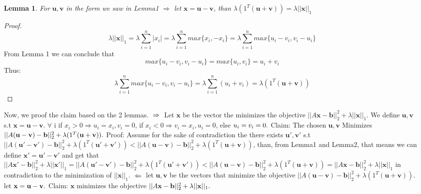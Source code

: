 \documentclass{article}
\newtheorem{lemma}{Lemma}
\begin{document}
\begin{enumerate}[(a)]
\begin{lemma} \label{b}
For $\mathbf{u}, \mathbf{v}$ in the form we saw in Lemma1 $\Rightarrow$ let $\mathbf{x} = \mathbf{u} - \mathbf{v}$, than $\lambda(1^T(\mathbf{u} + \mathbf{v})) = \lambda||\mathbf{x}||_1$
\end{lemma}
\begin{proof}
\[
\lambda||\mathbf{x}||_1 = \lambda\sum_{i=1}^{n}|x_i| = \lambda\sum_{i=1}^{n} max\{x_i, -x_i\} = \lambda\sum_{i=1}^{n}max\{u_i-v_i, v_i-u_i\}
\]
From Lemma 1 we can conclude that
\[
max\{u_i-v_i, v_i-u_i\} = max\{u_i, v_i\} = u_i + v_i
\]
Thus:
\[
\lambda\sum_{i=1}^{n} max\{u_i-v_i, v_i-u_i\} = \lambda\sum_{i=1}^{n} (u_i + v_i) = \lambda(1^T(\mathbf{u} + \mathbf{v}))
\]
\end{proof}
Now, we proof the claim based on the 2 lemmas.
$\\ \Rightarrow\\$
Let $\mathbf{x}$ be the vector the minimizes the objective $||A\mathbf{x} - \mathbf{b}||_2^2 + \lambda||\mathbf{x}||_1$. We define $\mathbf{u}, \mathbf{v}$ s.t $\mathbf{x} = \mathbf{u}-\mathbf{v}$. $\forall$ i if $x_i > 0 \Rightarrow u_i = x_i, v_i = 0$, if $x_i < 0 \Rightarrow v_i = x_i, u_i = 0$, else $u_i = v_i = 0.\\$
Claim: The chosen $\mathbf{u}, \mathbf{v}$ Minimizes $||A(\mathbf{u} - \mathbf{v}) - \mathbf{b}||_2^2 + \lambda(1^T(\mathbf{u} + \mathbf{v})).\\$ Proof: Assume for the sake of contradiction the there exists $\mathbf{u}', \mathbf{v}'$ s.t  $||A(\mathbf{u}' - \mathbf{v}') - \mathbf{b}||_2^2 + \lambda(1^T(\mathbf{u}' + \mathbf{v}')) < ||A(\mathbf{u} - \mathbf{v}) - \mathbf{b}||_2^2 + \lambda(1^T(\mathbf{u} + \mathbf{v}))$, than, from Lemma1 and Lemma2, that means we can define $\mathbf{x}'=\mathbf{u}'-\mathbf{v}'$ and get that $||A\mathbf{x}' - \mathbf{b}||_2^2 + \lambda||\mathbf{x}'||_1 = ||A(\mathbf{u}' - \mathbf{v}') - \mathbf{b}||_2^2 + \lambda(1^T(\mathbf{u}' + \mathbf{v}')) < ||A(\mathbf{u} - \mathbf{v}) - \mathbf{b}||_2^2 + \lambda(1^T(\mathbf{u} + \mathbf{v})) =  ||A\mathbf{x} - \mathbf{b}||_2^2 + \lambda||\mathbf{x}||_1$ in contradiction to the minimization of $||\mathbf{x}||_1$.
$\\ \Leftarrow\\$
let $\mathbf{u}, \mathbf{v}$ be the vectors that minimize the objective $||A(\mathbf{u} - \mathbf{v}) - \mathbf{b}||_2^2 + \lambda(1^T(\mathbf{u} + \mathbf{v})).$ let $\mathbf{x} = \mathbf{u} - \mathbf{v}.\\$ Claim: $\mathbf{x}$ minimizes the objective $||A\mathbf{x} - \mathbf{b}||_2^2 + \lambda||\mathbf{x}||_1.\\$

\end{enumerate}
\end{document}
